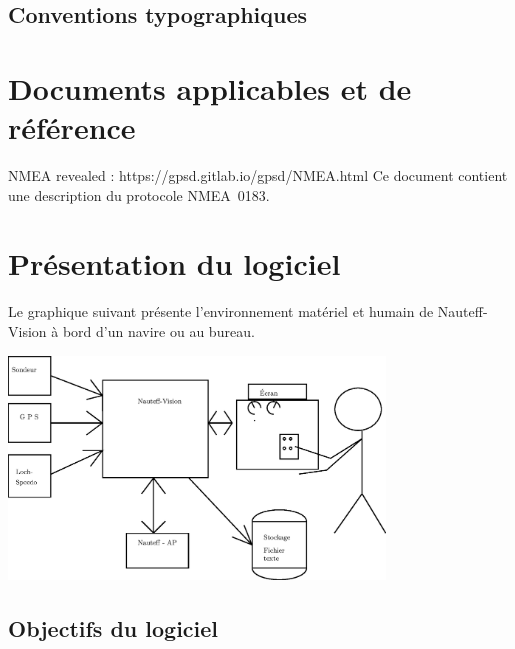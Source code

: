 \documentclass[a4paper,11pt]{report}
\begin{document}
\section{Conventions typographiques}

\chapter{Documents applicables et de référence}

NMEA revealed : https://gpsd.gitlab.io/gpsd/NMEA.html
Ce document contient une description du protocole NMEA~0183.


\printglossary[numberedsection, type=\acronymtype, title=Terminologie]

\chapter{Présentation du logiciel}
\label{presentation}
Le graphique suivant présente l'environnement matériel et humain
de Nauteff-Vision à bord d'un navire ou au bureau.

\includegraphics[width=10cm]{figures/Nauteff-Vision-envt.eps}


\section{Objectifs du logiciel}
\end{document}
